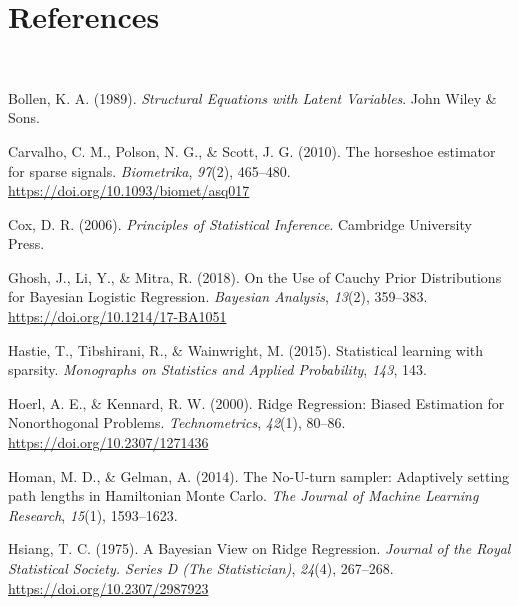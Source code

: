 \documentclass[
  man,floatsintext]{apa6}
\newlength{\cslhangindent}
\newlength{\cslentryspacingunit} %
\newenvironment{CSLReferences}[2] %
 {%
  \setlength{\parindent}{0pt}
  \ifodd #1
  \let\oldpar\par
  \def\par{\hangindent=\cslhangindent\oldpar}
  \fi
  \setlength{\parskip}{#2\cslentryspacingunit}
 }%
 {}
\begin{document}
\clearpage

\hypertarget{references}{%
\section{References}\label{references}}

~

\begingroup
\setlength{\parindent}{-0.5in}
\setlength{\leftskip}{0.5in}

\hypertarget{refs}{}
\begin{CSLReferences}{1}{0}
\leavevmode{}%
Bollen, K. A. (1989). \emph{Structural {Equations} with {Latent} {Variables}}. John Wiley \& Sons.

\leavevmode{}%
Carvalho, C. M., Polson, N. G., \& Scott, J. G. (2010). The horseshoe estimator for sparse signals. \emph{Biometrika}, \emph{97}(2), 465--480. \url{https://doi.org/10.1093/biomet/asq017}

\leavevmode{}%
Cox, D. R. (2006). \emph{Principles of {Statistical} {Inference}}. Cambridge University Press.

\leavevmode{}%
Ghosh, J., Li, Y., \& Mitra, R. (2018). On the {Use} of {Cauchy} {Prior} {Distributions} for {Bayesian} {Logistic} {Regression}. \emph{Bayesian Analysis}, \emph{13}(2), 359--383. \url{https://doi.org/10.1214/17-BA1051}

\leavevmode{}%
Hastie, T., Tibshirani, R., \& Wainwright, M. (2015). Statistical learning with sparsity. \emph{Monographs on Statistics and Applied Probability}, \emph{143}, 143.

\leavevmode{}%
Hoerl, A. E., \& Kennard, R. W. (2000). Ridge {Regression}: {Biased} {Estimation} for {Nonorthogonal} {Problems}. \emph{Technometrics}, \emph{42}(1), 80--86. \url{https://doi.org/10.2307/1271436}

\leavevmode{}%
Homan, M. D., \& Gelman, A. (2014). The {No}-{U}-turn sampler: Adaptively setting path lengths in {Hamiltonian} {Monte} {Carlo}. \emph{The Journal of Machine Learning Research}, \emph{15}(1), 1593--1623.

\leavevmode{}%
Hsiang, T. C. (1975). A {Bayesian} {View} on {Ridge} {Regression}. \emph{Journal of the Royal Statistical Society. Series D (The Statistician)}, \emph{24}(4), 267--268. \url{https://doi.org/10.2307/2987923}


\end{CSLReferences}
\end{document}
